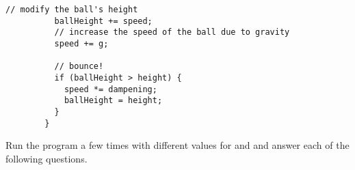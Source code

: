 \begin{questions}
\begin{lstlisting}[basicstyle=\small\ttfamily]
          // modify the ball's height
          ballHeight += speed;
          // increase the speed of the ball due to gravity
          speed += g;

          // bounce!
          if (ballHeight > height) {
            speed *= dampening;
            ballHeight = height;
          }
        }
      \end{lstlisting}
      Run the program a few times with different values for  and  and answer each of the following questions.
  \end{questions}

